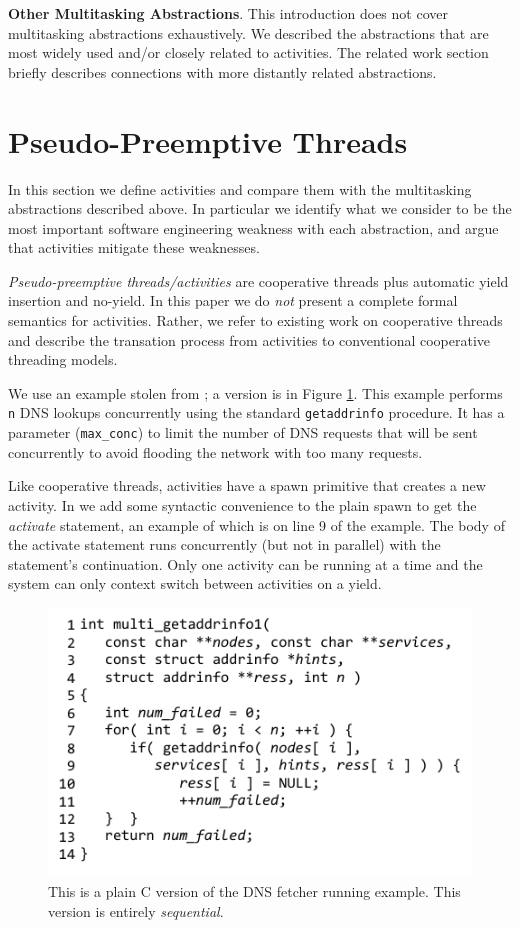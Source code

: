 \documentclass[9pt,preprint]{sigplanconf}
\begin{document}
\textbf{Other Multitasking Abstractions}.
This introduction does not cover multitasking abstractions exhaustively.
We described the abstractions that are most widely used and/or closely related to activities.
The related work section briefly describes connections with more distantly related abstractions.

\section{Pseudo-Preemptive Threads}

In this section we define activities and compare them with the multitasking abstractions described above.
In particular we identify what we consider to be the most important software engineering weakness with each abstraction, and argue that activities mitigate these weaknesses.

\emph{Pseudo-preemptive threads\slash{}activities} are cooperative threads plus automatic yield insertion and no-yield.
In this paper we do \emph{not} present a complete formal semantics for activities.
Rather, we refer to existing work on cooperative threads \cite{Abadi2009} and describe the transation process from activities to conventional cooperative threading models.

We use an example stolen from \cite{Krohn2007}; a \charcoal{} version is in Figure \ref{fig:charcoal_multidns_seq}.
This example performs \texttt{n} DNS lookups concurrently using the standard \texttt{getaddrinfo} procedure.
It has a parameter (\texttt{max\_conc}) to limit the number of DNS requests that will be sent concurrently to avoid flooding the network with too many requests.

Like cooperative threads, activities have a spawn primitive that creates a new activity.
In \charcoal{} we add some syntactic convenience to the plain spawn to get the \emph{activate} statement, an example of which is on line 9 of the example.
The body of the activate statement runs concurrently (but not in parallel) with the statement's continuation.
Only one activity can be running at a time and the system can only context switch between activities on a yield.

\begin{figure}
\includegraphics{multi_getaddrinfo_seq}
\caption{This is a plain C version of the DNS fetcher running example.
  This version is entirely \emph{sequential}.}
\label{fig:charcoal_multidns_seq}
\end{figure}
\end{document}
